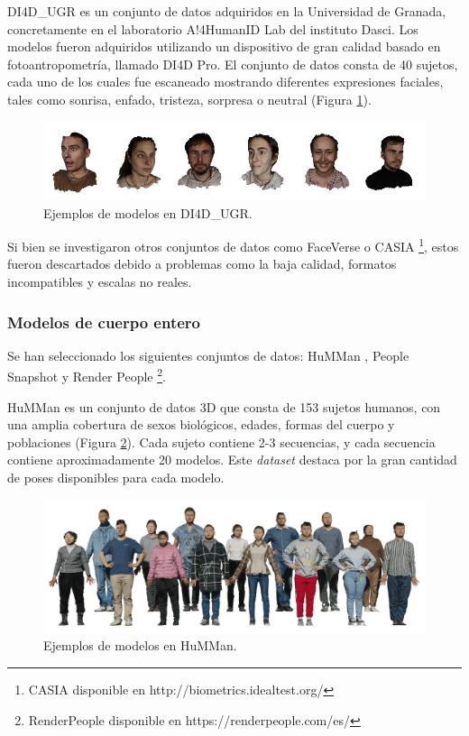 DI4D\_UGR es un conjunto de datos adquiridos en la Universidad de Granada, concretamente en el laboratorio A!4HumanID Lab del instituto Dasci. Los modelos fueron adquiridos utilizando un dispositivo de gran calidad basado en fotoantropometría, llamado DI4D Pro. El conjunto de datos consta de 40 sujetos, cada uno de los cuales fue escaneado mostrando diferentes expresiones faciales, tales como sonrisa, enfado, tristeza, sorpresa o neutral (Figura \ref{fig18.2}).

\begin{figure}[H]
	\centering
	\includegraphics[scale=0.8]{imagenes/cap4/di4d.png}
	\caption[Ejemplos DI4D\_UGR.]{Ejemplos de modelos en DI4D\_UGR.}
	\label{fig18.2}
\end{figure}

Si bien se investigaron otros conjuntos de datos como FaceVerse \cite{64} o CASIA \footnote{CASIA disponible en http://biometrics.idealtest.org/}, estos fueron descartados debido a problemas como la baja calidad, formatos incompatibles y escalas no reales.

\subsubsection{Modelos de cuerpo entero}
Se han seleccionado los siguientes conjuntos de datos: HuMMan \cite{62}, People Snapshot \cite{63} y Render People \footnote{RenderPeople disponible en https://renderpeople.com/es/}.

HuMMan \cite{62} es un conjunto de datos 3D que consta de 153 sujetos humanos, con una amplia cobertura de sexos biológicos, edades, formas del cuerpo y poblaciones (Figura \ref{fig19}). Cada sujeto contiene 2-3 secuencias, y cada secuencia contiene aproximadamente 20 modelos. Este \textit{dataset} destaca por la gran cantidad de poses disponibles para cada modelo.

\begin{figure}[H]
	\centering
	\includegraphics[scale=0.4]{imagenes/cap4/humman.png}
	\caption[Ejemplos HuMMan.]{Ejemplos de modelos en HuMMan.}
	\label{fig19}
\end{figure}

